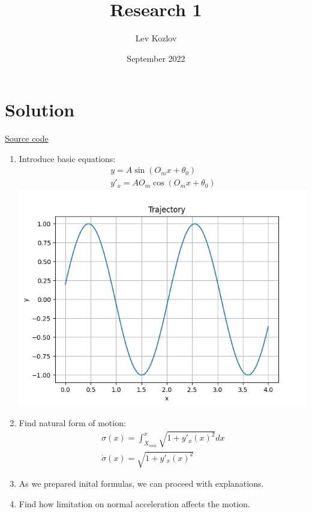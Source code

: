 \documentclass{article}
\title{Research 1}
\author{Lev Kozlov}
\date{September 2022}
\begin{document}
\maketitle

\section*{Solution}

\href{https://github.com/lvjonok/f22-theoretical-mechanics/blob/master/research1/main.ipynb}{Source code}

\begin{enumerate}
      \item Introduce basic equations:
            \begin{align}
                  y = A \sin(O_m x + \theta_0) \\
                  y'_x = A O_m \cos(O_m x + \theta_0)
            \end{align}
            \includegraphics[width=\linewidth]{trajectory.png}
      \item Find natural form of motion:
            \begin{align}
                  \sigma(x) = \int_{X_{min}}^{x} \sqrt{1 + {y'_{x}(x)}^2} dx \\
                  \dot{\sigma}(x) = \sqrt{1 + {y'_{x}(x)}^2}
            \end{align}
      \item As we prepared inital formulas, we can proceed with explanations.
      \item Find how limitation on normal acceleration affects the motion.

\end{enumerate}
\end{document}

